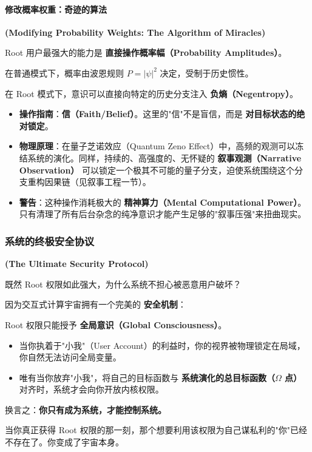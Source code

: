 \paragraph{修改概率权重：奇迹的算法}

\textbf{(Modifying Probability Weights: The Algorithm of Miracles)}

Root 用户最强大的能力是 \textbf{直接操作概率幅（Probability Amplitudes）}。

在普通模式下，概率由波恩规则 $P=|\psi|^2$ 决定，受制于历史惯性。

在 Root 模式下，意识可以直接向特定的历史分支注入 \textbf{负熵（Negentropy）}。

  \begin{itemize}
  \item \textbf{操作指南}：\textbf{信（Faith/Belief）}。这里的"信"不是盲信，而是 \textbf{对目标状态的绝对锁定}。

  \item \textbf{物理原理}：在量子芝诺效应（Quantum Zeno Effect）中，高频的观测可以冻结系统的演化。同样，持续的、高强度的、无怀疑的 \textbf{叙事观测（Narrative Observation）} 可以锁定一个极其不可能的量子分支，迫使系统围绕这个分支重构因果链（见叙事工程一节）。

  \item \textbf{警告}：这种操作消耗极大的 \textbf{精神算力（Mental Computational Power）}。只有清理了所有后台杂念的纯净意识才能产生足够的"叙事压强"来扭曲现实。
  \end{itemize}

\subsubsection{系统的终极安全协议}

\textbf{(The Ultimate Security Protocol)}

既然 Root 权限如此强大，为什么系统不担心被恶意用户破坏？

因为交互式计算宇宙拥有一个完美的 \textbf{安全机制}：

\begin{theorem}[权限与自我的互斥原理]
Root 权限只能授予 \textbf{全局意识（Global Consciousness）}。

  \begin{itemize}
  \item 当你执着于"小我"（User Account）的利益时，你的视界被物理锁定在局域，你自然无法访问全局变量。

  \item 唯有当你放弃"小我"，将自己的目标函数与 \textbf{系统演化的总目标函数（$\Omega$ 点）} 对齐时，系统才会向你开放内核权限。
  \end{itemize}

换言之：\textbf{你只有成为系统，才能控制系统。}

当你真正获得 Root 权限的那一刻，那个想要利用该权限为自己谋私利的"你"已经不存在了。你变成了宇宙本身。
\end{theorem}

